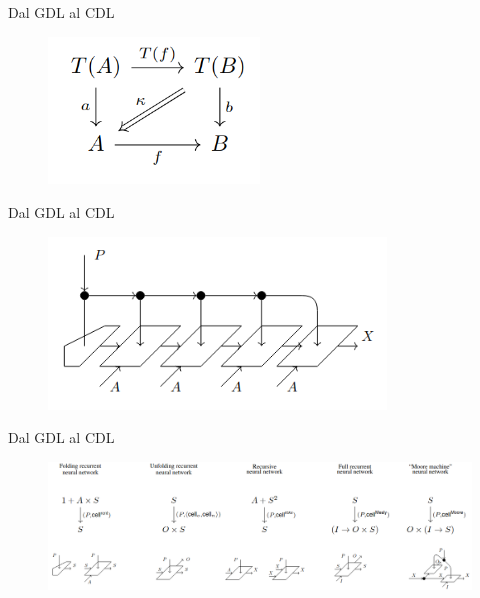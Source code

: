 \documentclass{beamer}
\begin{document}
\begin{frame}{Dal GDL al CDL}
    \begin{figure}
        \begin{center}
            \includegraphics[width=0.5\textwidth]{figures/lax_algebra_hom.png}
            \caption*{}
        \end{center}
    \end{figure}
\end{frame}

\begin{frame}{Dal GDL al CDL}
    \begin{figure}
        \begin{center}
            \includegraphics[width=0.8\textwidth]{figures/folding_rnn.png}
            \caption*{}
        \end{center}
    \end{figure}
\end{frame}

\begin{frame}{Dal GDL al CDL}
    \begin{figure}
        \begin{center}
            \includegraphics[width=1\textwidth]{figures/cells.png}
            \caption*{}
        \end{center}
    \end{figure}
\end{frame}
\end{document}

